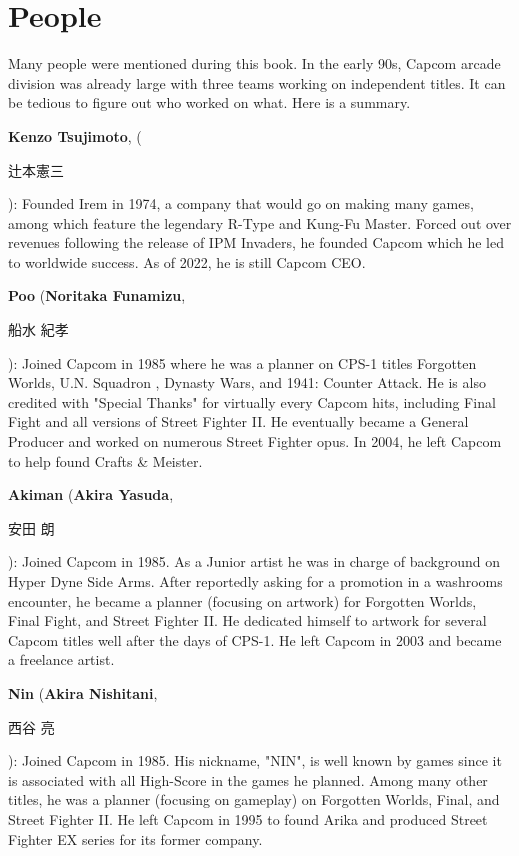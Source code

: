 \chapter{People} 
\label{people}

Many people were mentioned during this book. In the early 90s, Capcom arcade division was already large with three teams working on independent titles. It can be tedious to figure out who worked on what. Here is a summary.

\textbf{Kenzo Tsujimoto}, (\begin{CJK}{UTF8}{min}辻本憲三\end{CJK}): Founded Irem in 1974, a company that would go on making many games, among which feature the legendary R-Type and Kung-Fu Master. Forced out over revenues following the release of IPM Invaders, he founded Capcom which he led to worldwide success. As of 2022, he is still Capcom CEO. 

\textbf{Poo} (\textbf{Noritaka Funamizu}, \begin{CJK}{UTF8}{min}船水 紀孝\end{CJK}): Joined Capcom in 1985 where he was a planner on CPS-1 titles Forgotten Worlds, U.N. Squadron , Dynasty Wars, and 1941: Counter Attack. He is also credited with "Special Thanks" for virtually every Capcom hits, including Final Fight and all versions of Street Fighter II. He eventually became a General Producer and worked on numerous Street Fighter opus. In 2004, he left Capcom to help found Crafts \& Meister.

\textbf{Akiman} (\textbf{Akira Yasuda}, \begin{CJK}{UTF8}{min}安田 朗\end{CJK}): Joined Capcom in 1985. As a Junior artist he was in charge of background on Hyper Dyne Side Arms. After reportedly asking for a promotion in a washrooms encounter, he became a planner (focusing on artwork) for Forgotten Worlds, Final Fight, and Street Fighter II. He dedicated himself to artwork for several Capcom titles well after the days of CPS-1. He left Capcom in 2003 and became a freelance artist.

\textbf{Nin} (\textbf{Akira Nishitani}, \begin{CJK}{UTF8}{min}西谷 亮\end{CJK}): Joined Capcom in 1985. His nickname, "NIN", is well known by games since it is associated with all High-Score in the games he planned. Among many other titles, he was a planner (focusing on gameplay) on Forgotten Worlds, Final, and Street Fighter II. He left Capcom in 1995 to found Arika and produced Street Fighter EX series for its former company.

